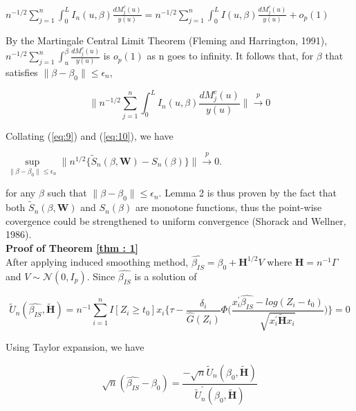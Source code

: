 \documentclass[12pt]{article}
\begin{document}
	\begin{center}
		$n^{-1/2}\sum_{j=1}^{n} \int_{0}^{L}I_n(u,\beta)\frac{dM_j^c(u)}{y(u)}=n^{-1/2}\sum_{j=1}^{n}\int_{0}^{L}I(u,\beta)\frac{dM_j^c(u)}{y(u)}+o_p(1)$
	\end{center}

	\noindent By the Martingale Central Limit Theorem (Fleming and Harrington, 1991), $n^{-1/2}\sum_{j=1}^{n}\int_{u}^{\beta}\frac{dM_j^c(u)}{y(u)}$ is $o_p(1)$ as n goes to infinity. It follows that, for $\beta$ that satisfies $\lVert \beta - \beta_0 \rVert \leq \epsilon_n$,

	\begin{equation} \label{eq:10}
		\Bigg\lVert n^{-1/2} \sum_{j=1}^{n} \int_{0}^{L} I_n(u,\beta)\frac{dM_j^c(u)}{y(u)} \Bigg\rVert \xrightarrow{p} 0
	\end{equation}

	Collating (\ref{eq:9}) and (\ref{eq:10}), we have
	\begin{center}
		$\sup\limits_{\lVert \beta - \beta_0 \rVert \leq \epsilon_n} \lVert {n^{1/2}} \{ \tilde{S}_n(\beta, \textbf{W})-S_n(\beta) \} \rVert \xrightarrow{p} 0$.
	\end{center}

	\noindent for any $\beta$ such that $\lVert \beta - \beta_0 \rVert \leq \epsilon_n$. Lemma 2 is thus proven by the fact that both $\tilde{S}_n(\beta, \textbf{W})$ and $S_n(\beta)$ are monotone functions, thus the point-wise covergence could be strengthened to uniform convergence (Shorack and Wellner, 1986).\\

	\noindent \textbf{Proof of Theorem \ref{thm : 1}}\\
	After applying induced smoothing method, $\hat{\beta_{IS}} = \beta_0+\textbf{H}^{1/2}V$ where $\textbf{H}=n^{-1}\Gamma$ and $V \sim\mathcal{N}(0,I_p)$.
	Since $\hat{\beta_{IS}}$ is a solution of

	\begin{equation} \label{eq : 11}
		\tilde{U}_n(\hat{\beta_{IS}}, \tilde{\textbf{H}})= n^{-1} \sum_{i=1}^{n} I[Z_i \geq t_0] x_i \Bigg\{\tau -  \frac{\delta_i}{\hat{G}(Z_i)}\Phi\Bigg(\frac{x_i^\prime\hat{\beta_{IS}}-log(Z_i-t_0)}{\sqrt{x_i^{\prime} \tilde{\textbf{H}}x_{i}}}\Bigg) \Bigg\}=0
	\end{equation}

	\noindent Using Taylor expansion, we have

	\begin{equation} \label{eq : 4}
		\sqrt{n}(\hat{\beta_{IS}}-\beta_0) = \frac{-\sqrt{n}\tilde{U}_n(\beta_0, \tilde{\textbf{H}})}{\tilde{U}_n^{\prime}(\beta_0,\tilde{\textbf{H}})}
	\end{equation}
\end{document}
